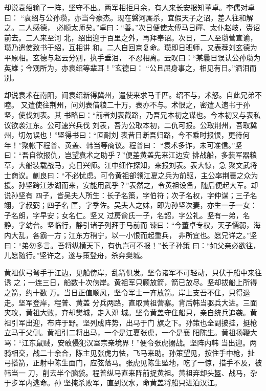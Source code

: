 却说袁绍输了一阵，坚守不出。两军相拒月余，有人来长安报知董卓。李儒对卓曰：
“袁绍与公孙瓒，亦当今豪杰。现在磐河厮杀，宜假天子之诏，差人往和解之。二人感德，
必顺太师矣。”卓曰：“善。”次日便使太傅马日磾、太仆赵岐，赍诏前去。二人来至河
北，绍出迎于百里之外，再拜奉诏。次日，二人至瓒营宣谕，瓒乃遣使致书于绍，互相讲
和。二人自回京复命。瓒即日班师，又表荐刘玄德为平原相。玄德与赵云分别，执手垂泪，
不忍相离。云叹曰：“某曩日误认公孙瓒为英雄；今观所为，亦袁绍等辈耳！”玄德曰：
“公且屈身事之，相见有日。”洒泪而别。

却说袁术在南阳，闻袁绍新得冀州，遣使来求马千匹。绍不与，术怒。自此兄弟不睦。
又遣使往荆州，问刘表借粮二十万，表亦不与。术恨之，密遣人遗书于孙坚，使伐刘表。其
书略曰：“前者刘表截路，乃吾兄本初之谋也。今本初又与表私议欲袭江东。公可速兴兵伐
刘表，吾为公取本初，二仇可报。公取荆州，吾取冀州，切勿误也！”坚得书曰：“叵耐刘
表昔日断吾归路，今不乘时报恨，更待何年！”聚帐下程普、黄盖、韩当等商议。程普曰：
“袁术多诈，未可准信。”坚曰：“吾自欲报仇，岂望袁术之助乎？”便差黄盖先来江边安
排战船，多装军器粮草，大船装载战马，克日兴师。江中细作探知，来报刘表。表大惊，急
聚文武将士商议。蒯良曰：“不必忧虑。可令黄祖部领江夏之兵为前驱，主公率荆襄之众为
援。孙坚跨江涉湖而来，安能用武乎？”表然之，令黄祖设备，随后便起大军。却说孙坚有
四子，皆吴夫人所生：长子名策，字伯符；次子名权，字仲谋；三子名翊，字叔弼；四子名
匡，字季佐。吴夫人之妹，即为孙坚次妻，亦生一子一女：子名朗，字早安；女名仁。坚又
过房俞氏一子，名韶，字公礼。坚有一弟，名静，字幼台。坚临行，静引诸子列拜于马前而
谏曰：“今董卓专权，天子懦弱，海内大乱，各霸一方；江东方稍宁，以一小恨而起重兵，
非所宜也。愿兄详之。”坚曰：“弟勿多言。吾将纵横天下，有仇岂可不报！”长子孙策
曰：“如父亲必欲往，儿愿随行。”坚许之，遂与策登舟，杀奔樊城。

黄祖伏弓弩手于江边，见船傍岸，乱箭俱发。坚令诸军不可轻动，只伏于船中来往诱
之；一连三日，船数十次傍岸。黄祖军只顾放箭，箭已放尽。坚却拔船上所得之箭，约十数
万。当日正值顺风，坚令军士一齐放箭。岸上支吾不住，只得退走。坚军登岸，程普、黄盖
分兵两路，直取黄祖营寨。背后韩当驱兵大进。三面夹攻，黄祖大败，弃却樊城，走入邓
城。坚令黄盖守住船只，亲自统兵追袭。黄祖引军出迎，布阵于野。坚列成阵势，出马于门
旗之下。孙策也全副披挂，挺枪立马于父侧。黄祖引二将出马，一个是江夏张虎，一个是襄
阳陈生。黄祖扬鞭大骂：“江东鼠贼，安敢侵犯汉室宗亲境界！”便令张虎搦战。坚阵内韩
当出迎。两骑相交，战二十余合，陈主见张虎力怯，飞马来助。孙策望见，按住手中枪，扯
弓搭箭，正射中陈生面门，应弦落马。张虎见陈生坠地，吃了一惊，措手不及，被韩当一
刀，削去半个脑袋。程普纵马直来阵前捉黄祖。黄祖弃却头盔、战马，杂于步军内逃命。孙
坚掩杀败军，直到汉水，命黄盖将船只进泊汉江。

